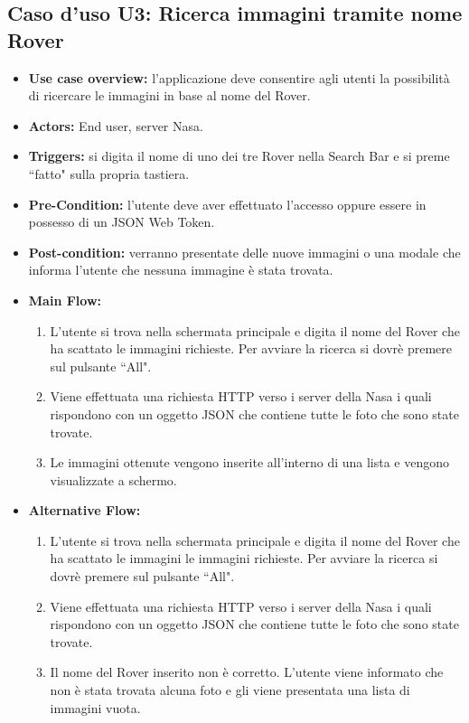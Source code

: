 \subsection*{Caso d'uso U3: Ricerca immagini tramite nome Rover}
\begin{itemize}
    \item  \textbf{Use case overview:} l'applicazione deve consentire agli utenti la possibilit\`a di ricercare le immagini in base al nome del Rover.
    \item \textbf{Actors:} End user, server Nasa.
    \item \textbf{Triggers:} si digita il nome di uno dei tre Rover nella Search Bar e si preme ``fatto" sulla propria tastiera.
    \item \textbf{Pre-Condition:} l'utente deve aver effettuato l'accesso oppure essere in possesso di un JSON Web Token.
    \item \textbf{Post-condition:} verranno presentate delle nuove immagini o una modale che informa l'utente che nessuna immagine \`e stata trovata.
    \item \textbf{Main Flow:} \begin{enumerate}
              \item L'utente si trova nella schermata principale e digita il nome del Rover che ha scattato le immagini richieste. Per avviare la ricerca si dovr\`e premere sul pulsante ``All".
              \item Viene effettuata una richiesta HTTP verso i server della Nasa i quali rispondono con un oggetto JSON che contiene tutte le foto che sono state trovate.
              \item Le immagini ottenute vengono inserite all'interno di una lista e vengono visualizzate a schermo.

          \end{enumerate}
    \item \textbf{Alternative Flow:}\begin{enumerate}
              \item L'utente si trova nella schermata principale e digita il nome del Rover che ha scattato le immagini le immagini richieste. Per avviare la ricerca si dovr\`e premere sul pulsante ``All".
              \item Viene effettuata una richiesta HTTP verso i server della Nasa i quali rispondono con un oggetto JSON che contiene tutte le foto che sono state trovate.
              \item Il nome del Rover inserito non \`e corretto. L'utente viene informato che non \`e stata trovata alcuna foto e gli viene presentata una lista di immagini vuota.

          \end{enumerate}
\end{itemize}
